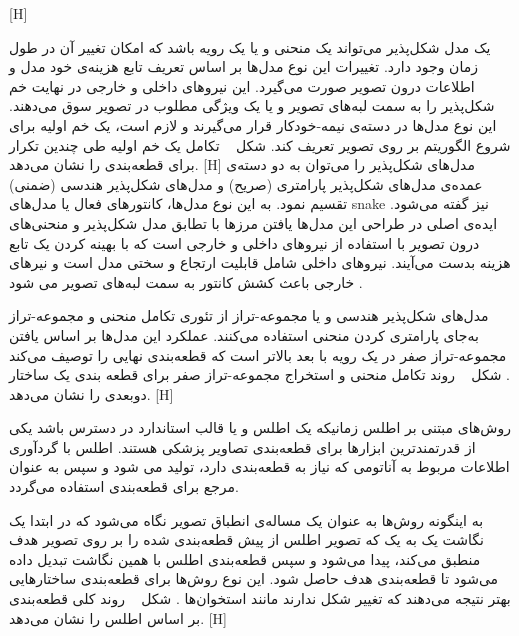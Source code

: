[H]


یک مدل شکل‌پذیر می‌تواند یک منحنی و یا یک رویه باشد که امکان تغییر آن در طول زمان وجود دارد. تغییرات این نوع مدل‌ها بر اساس تعریف تابع هزینه‌ی خود مدل و اطلاعات درون تصویر صورت می‌گیرد. این نیروهای داخلی و خارجی در نهایت خم شکل‌پذیر را به سمت لبه‌های تصویر و یا یک ویژگی مطلوب در تصویر سوق می‌دهند. این نوع مدل‌ها در دسته‌ی نیمه-خودکار قرار می‌گیرند و لازم است، یک خم اولیه‌ برای شروع الگوریتم بر روی تصویر تعریف کند. شکل ~ تکامل یک خم اولیه طی چندین تکرار برای قطعه‌بندی را نشان می‌دهد.
[H]
مدل‌های شکل‌پذیر را می‌توان به دو دسته‌ی عمده‌ی مدل‌های شکل‌پذیر پارامتری (صریح)  و مدل‌های شکل‌پذیر هندسی (ضمنی) تقسیم نمود.
به این نوع مدل‌ها، کانتور‌های فعال یا مدل‌های snake نیز گفته می‌شود. ایده‌ی اصلی در طراحی این مدل‌ها یافتن مرزها با تطابق مدل شکل‌پذیر و منحنی‌های درون تصویر با استفاده از نیروهای داخلی و خارجی است که با بهینه‌ کردن یک تابع هزینه بدست می‌آیند. نیروهای داخلی شامل قابلیت ارتجاع و سختی مدل است و نیرهای خارجی باعث کشش کانتور به سمت لبه‌های تصویر می شود .

مدل‌های شکل‌پذیر هندسی و یا مجموعه-تراز از تئوری تکامل منحنی و مجموعه-تراز به‌جای پارامتری کردن منحنی استفاده می‌کنند. عملکرد این مدل‌ها بر اساس یافتن مجموعه-تراز صفر در یک رویه‌ با بعد بالاتر است که قطعه‌بندی نهایی را توصیف می‌کند . شکل ~ روند تکامل منحنی و استخراج مجموعه‌-تراز صفر برای قطعه بندی یک ساختار دوبعدی را نشان می‌دهد.
[H]

روش‌های مبتنی بر اطلس زمانیکه یک اطلس و یا قالب استاندارد در دسترس باشد یکی از قدرتمندترین ابزارها برای قطعه‌بندی تصاویر پزشکی هستند. اطلس با گردآوری اطلاعات مربوط به آناتومی که نیاز به قطعه‌بندی دارد، تولید می شود و سپس به عنوان مرجع برای قطعه‌بندی استفاده می‌گردد.

به اینگونه روش‌ها به عنوان یک مساله‌ی انطباق تصویر نگاه می‌شود که در ابتدا یک نگاشت یک به یک که تصویر اطلس از پیش قطعه‌بندی شده را بر روی تصویر هدف منطبق می‌کند، پیدا می‌شود و سپس قطعه‌بندی اطلس با همین نگاشت تبدیل داده می‌شود تا قطعه‌بندی هدف حاصل شود. این نوع روش‌ها برای قطعه‌بندی ساختارهایی بهتر نتیجه می‌دهند که تغییر شکل ندارند مانند استخوان‌ها . شکل ~ روند کلی قطعه‌بندی بر اساس اطلس را نشان می‌دهد.
 [H]

